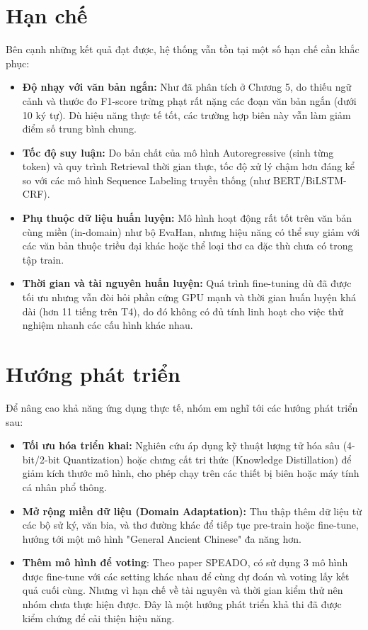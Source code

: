 \section{Hạn chế}

Bên cạnh những kết quả đạt được, hệ thống vẫn tồn tại một số hạn chế cần khắc phục:

\begin{itemize}
    \item \textbf{Độ nhạy với văn bản ngắn:} Như đã phân tích ở Chương 5, do thiếu ngữ cảnh và thước đo F1-score trừng phạt rất nặng các đoạn văn bản ngắn (dưới 10 ký tự). Dù hiệu năng thực tế tốt, các trường hợp biên này vẫn làm giảm điểm số trung bình chung.
    
    \item \textbf{Tốc độ suy luận:} Do bản chất của mô hình Autoregressive (sinh từng token) và quy trình Retrieval thời gian thực, tốc độ xử lý chậm hơn đáng kể so với các mô hình Sequence Labeling truyền thống (như BERT/BiLSTM-CRF).
    
    \item \textbf{Phụ thuộc dữ liệu huấn luyện:} Mô hình hoạt động rất tốt trên văn bản cùng miền (in-domain) như bộ EvaHan, nhưng hiệu năng có thể suy giảm với các văn bản thuộc triều đại khác hoặc thể loại thơ ca đặc thù chưa có trong tập train.
    
    \item \textbf{Thời gian và tài nguyên huấn luyện:} Quá trình fine-tuning dù đã được tối ưu nhưng vẫn đòi hỏi phần cứng GPU mạnh và thời gian huấn luyện khá dài (hơn 11 tiếng trên T4), do đó không có đủ tính linh hoạt cho việc thử nghiệm nhanh các cấu hình khác nhau.
\end{itemize}

\section{Hướng phát triển}

Để nâng cao khả năng ứng dụng thực tế, nhóm em nghĩ tới các hướng phát triển sau:

\begin{itemize}
    \item \textbf{Tối ưu hóa triển khai:} Nghiên cứu áp dụng kỹ thuật lượng tử hóa sâu (4-bit/2-bit Quantization) hoặc chưng cất tri thức (Knowledge Distillation) để giảm kích thước mô hình, cho phép chạy trên các thiết bị biên hoặc máy tính cá nhân phổ thông.
    
    \item \textbf{Mở rộng miền dữ liệu (Domain Adaptation):} Thu thập thêm dữ liệu từ các bộ sử ký, văn bia, và thơ đường khác để tiếp tục pre-train hoặc fine-tune, hướng tới một mô hình "General Ancient Chinese" đa năng hơn.
    
    \item \textbf{Thêm mô hình để voting}: Theo paper SPEADO, có sử dụng 3 mô hình được fine-tune với các setting khác nhau để cùng dự đoán và voting lấy kết quả cuối cùng. Nhưng vì hạn chế về tài nguyên và thời gian kiểm thử nên nhóm chưa thực hiện được. Đây là một hướng phát triển khả thi đã được kiểm chứng để cải thiện hiệu năng.
\end{itemize}